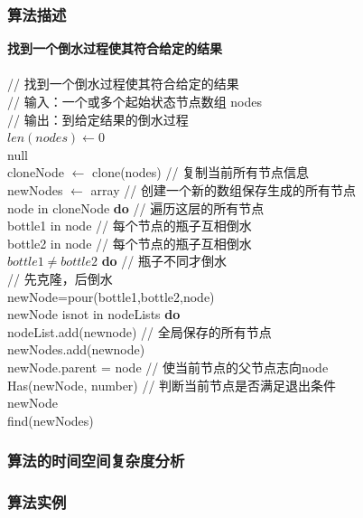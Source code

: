 \documentclass{ctexart}
\newcommand\tab[1][1cm]{\hspace*{#1}}
\begin{document}
\subsubsection{算法描述 }
   {\bfseries 找到一个倒水过程使其符合给定的结果} \\
   \tab{\bfseries{算法 find $(nodes)$ }} \\
	\tab// 找到一个倒水过程使其符合给定的结果\\
	\tab// 输入：一个或多个起始状态节点数组 nodes \\
	\tab// 输出：到给定结果的倒水过程\\
	\tab{\bfseries if} $len(nodes) \leftarrow 0$ \\
	\tab\tab{\bfseries return} null \\
	\tab cloneNode $\leftarrow$ clone(nodes) // 复制当前所有节点信息 \\
	\tab newNodes $\leftarrow$ array // 创建一个新的数组保存生成的所有节点 \\
	\tab{\bfseries for} node in cloneNode {\bfseries do} // 遍历这层的所有节点 \\
	\tab\tab{\bfseries for} bottle1 in node // 每个节点的瓶子互相倒水 \\
	\tab\tab{\bfseries for} bottle2 in node // 每个节点的瓶子互相倒水 \\
	\tab\tab\tab{\bfseries if} $bottle1 \ne bottle2$ {\bfseries do} // 瓶子不同才倒水\\
	\tab\tab\tab// 先克隆，后倒水				\\
	\tab\tab\tab newNode=pour(bottle1,bottle2,node) \\
	\tab\tab\tab{\bfseries if} newNode isnot in nodeLists {\bfseries do} \\
	\tab\tab\tab\tab nodeList.add(newnode) // 全局保存的所有节点\\
	\tab\tab\tab\tab newNodes.add(newnode) \\
	\tab\tab\tab\tab newNode.parent = node // 使当前节点的父节点志向node\\
	\tab\tab\tab{\bfseries if} Has(newNode, number) // 判断当前节点是否满足退出条件 \\
	\tab\tab\tab\tab{\bfseries return} newNode \\
	\tab find(newNodes)
\subsubsection{算法的时间空间复杂度分析 }
\subsubsection{算法实例}
\end{document}
